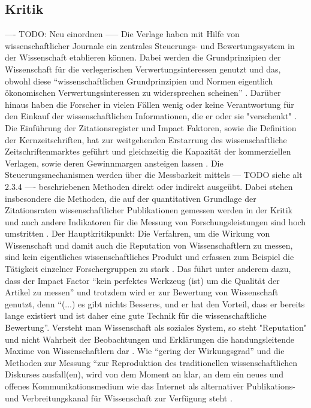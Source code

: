 \subsection{Kritik}
---- TODO: Neu einordnen -----
Die Verlage haben mit Hilfe von wissenschaftlicher Journale ein zentrales Steuerungs- und Bewertungssystem in der Wissenschaft etablieren können. Dabei werden die Grundprinzipien der Wissenschaft für die verlegerischen Verwertungsinteressen genutzt und das, obwohl diese “wissenschaftlichen Grundprinzipien und Normen eigentlich ökonomischen Verwertungsinteressen zu widersprechen scheinen” \cite{hanekop_2006}. Darüber hinaus haben die Forscher in vielen Fällen wenig oder keine Verantwortung für den Einkauf der wissenschaftlichen Informationen, die er oder sie "verschenkt" \cite{steele_2006}. Die Einführung der Zitationsregister und Impact Faktoren, sowie die Definition der Kernzeitschriften, hat zur weitgehenden Erstarrung des wissenschaftliche Zeitschriftenmarktes geführt und gleichzeitig die Kapazität der kommerziellen Verlagen, sowie deren Gewinnmargen ansteigen lassen \cite{CREATe_2014}. Die Steuerungsmechanismen werden über die Messbarkeit mittels --- TODO siehe alt 2.3.4 ---- beschriebenen Methoden direkt oder indirekt ausgeübt. Dabei stehen insbesondere die Methoden, die auf der quantitativen Grundlage der Zitationsraten wissenschaftlicher Publikationen gemessen werden in der Kritik \cite{Dong_2005} und auch andere Indikatoren für die Messung von Forschungsleistungen sind hoch umstritten \cite{Hornbostel_1997} \cite{Hicks_1996} \cite{Havemann_2002}. Der Hauptkritikpunkt: Die Verfahren, um die Wirkung von Wissenschaft und damit auch die Reputation von Wissenschaftlern zu messen, sind kein eigentliches wissenschaftliches Produkt\cite{suchen} und erfassen zum Beispiel die Tätigkeit einzelner Forschergruppen zu stark \cite{schmoch_2009}. Das führt unter anderem dazu, dass der Impact Factor “kein perfektes Werkzeug (ist) um die Qualität der Artikel zu messen” und trotzdem wird er zur Bewertung von Wissenschaft genutzt, denn “(...) es gibt nichts Besseres, und er hat den Vorteil, dass er bereits lange existiert und ist daher eine gute Technik für die wissenschaftliche Bewertung”\cite{garfield_1999}. Versteht man Wissenschaft als soziales System, so steht "Reputation" und nicht Wahrheit der Beobachtungen und Erklärungen die handungsleitende Maxime von Wissenschaftlern dar \cite{luhmann_1970_selbststeuerung}. Wie “gering der Wirkungsgrad” und die Methoden zur Messung “zur Reproduktion des traditionellen wissenschaftlichen Diskurses ausfall(en), wird von dem Moment an klar, an dem ein neues und offenes Kommunikationsmedium wie das Internet als alternativer Publikations- und Verbreitungskanal für Wissenschaft zur Verfügung steht \cite{Rost_1998}. 


